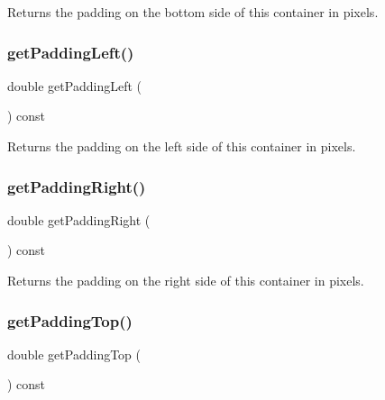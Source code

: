 Returns the padding on the bottom side of this container in pixels. 

\mbox{\label{classsgl_1_1GContainer_af28748a6467a4d3337788578522fa8f4}} 
\subsubsection{\texorpdfstring{get\+Padding\+Left()}{getPaddingLeft()}}
{\footnotesize\ttfamily double get\+Padding\+Left (\begin{DoxyParamCaption}{ }\end{DoxyParamCaption}) const\hspace{0.3cm}{\ttfamily [virtual]}}



Returns the padding on the left side of this container in pixels. 

\mbox{\label{classsgl_1_1GContainer_a8d75cea586f7cd6611432122a080ecce}} 
\subsubsection{\texorpdfstring{get\+Padding\+Right()}{getPaddingRight()}}
{\footnotesize\ttfamily double get\+Padding\+Right (\begin{DoxyParamCaption}{ }\end{DoxyParamCaption}) const\hspace{0.3cm}{\ttfamily [virtual]}}



Returns the padding on the right side of this container in pixels. 

\mbox{\label{classsgl_1_1GContainer_ada97c35b2f3366886a49d63fff9d7bd4}} 
\subsubsection{\texorpdfstring{get\+Padding\+Top()}{getPaddingTop()}}
{\footnotesize\ttfamily double get\+Padding\+Top (\begin{DoxyParamCaption}{ }\end{DoxyParamCaption}) const\hspace{0.3cm}{\ttfamily [virtual]}}



